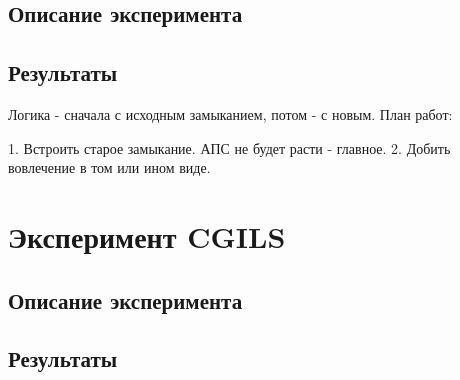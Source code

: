 \documentclass[12pt]{article}
\begin{document}
\subsection{Описание эксперимента}

\subsection{Результаты}

Логика - сначала с исходным замыканием, потом - с новым. 
План работ:

1. Встроить старое замыкание. АПС не будет расти - главное.
2. Добить вовлечение в том или ином виде.

\section{Эксперимент CGILS}

\subsection{Описание эксперимента}

\subsection{Результаты}
\end{document}
